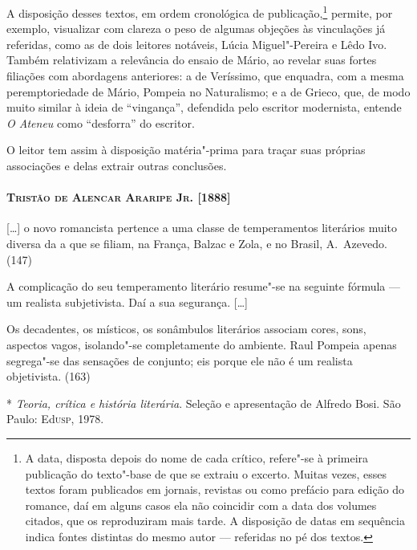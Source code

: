 A disposição desses textos, em ordem cronológica de
publicação,\footnote{ A data, disposta depois do nome de cada crítico,
refere"-se à primeira publicação do texto"-base de que se extraiu o
excerto. Muitas vezes, esses textos foram publicados em jornais,
revistas ou como prefácio para edição do romance, daí em alguns casos
ela não coincidir com a data dos volumes citados, que os reproduziram
mais tarde. A disposição de datas em sequência indica fontes distintas
do mesmo autor --- referidas no pé dos textos.} permite,
por exemplo, visualizar com clareza o peso de algumas objeções às
vinculações já referidas, como as de dois leitores notáveis, Lúcia
Miguel"-Pereira e Lêdo Ivo. Também relativizam a relevância do ensaio
de Mário, ao revelar suas fortes filiações com abordagens anteriores: a
de Veríssimo, que enquadra, com a mesma peremptoriedade de Mário,
Pompeia no Naturalismo; e a de Grieco, que, de modo muito similar à
ideia de ``vingança'', defendida pelo escritor modernista, entende
\textit{O Ateneu} como ``desforra'' do escritor. 

O leitor tem assim à disposição matéria"-prima para traçar suas
próprias associações e delas extrair outras conclusões.

\newcommand{\olho}[2]{\paragraph{\textsc{#2} [#1]}}

\olho{1888}{Tristão de Alencar Araripe Jr.}

[\ldots] o novo romancista pertence a uma classe de temperamentos
literários muito diversa da a que se filiam, na França, Balzac e Zola,
e no Brasil, A.~Azevedo. (147)

A complicação do seu temperamento literário resume"-se na seguinte
fórmula --- um realista subjetivista. Daí a sua segurança. [\ldots]

Os decadentes, os místicos, os sonâmbulos literários associam cores,
sons, aspectos vagos, isolando"-se completamente do ambiente. Raul
Pompeia apenas segrega"-se das sensações de conjunto; eis porque ele
não é um realista objetivista. (163)

\newcommand{\fontes}[1]{\begin{footnotesize}*\hspace{1ex} #1\end{footnotesize}}
\fontes{\textit{Teoria, crítica e história
literária}. Seleção e apresentação de Alfredo Bosi. São
Paulo: Ed\textsc{usp}, 1978.}

